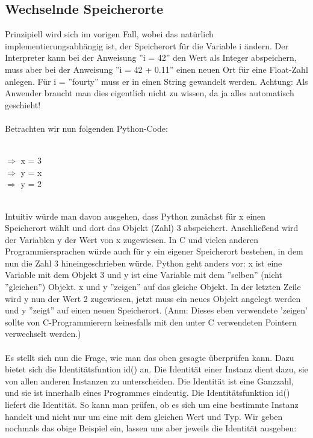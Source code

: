 \subsection{Wechselnde Speicherorte}
Prinzipiell wird sich im vorigen Fall, wobei das natürlich implementierungsabhängig ist, der Speicherort für die Variable i ändern. Der Interpreter kann bei der Anweisung ''i = 42'' den Wert als Integer abspeichern, muss aber bei der Anweisung ''i = 42 + 0.11'' einen neuen Ort für eine Float-Zahl anlegen. Für i = ''fourty'' muss er in einen String gewandelt werden.
Achtung: Als Anwender braucht man dies eigentlich nicht zu wissen, da ja alles automatisch geschieht! \\
\\
Betrachten wir nun folgenden Python-Code: \\
\\
\begin{MyConsoleBox}{
${\Longrightarrow}$ x = 3 \\
${\Longrightarrow}$ y = x \\
${\Longrightarrow}$ y = 2 \\
}\end{MyConsoleBox}
\\
Intuitiv würde man davon ausgehen, dass Python zunächst für x einen Speicherort wählt und dort das Objekt (Zahl) 3 abspeichert. Anschließend wird der Variablen y der Wert von x zugewiesen. In C und vielen anderen Programmiersprachen würde auch für y ein eigener Speicherort bestehen, in dem nun die Zahl 3 hineingeschrieben würde. Python geht anders vor: x ist eine Variable mit dem Objekt 3 und y ist eine Variable mit dem ''selben'' (nicht ''gleichen'') Objekt. x und y ''zeigen'' auf das gleiche Objekt. In der letzten Zeile wird y nun der Wert 2 zugewiesen, jetzt muss ein neues Objekt angelegt werden und y ''zeigt'' auf einen neuen Speicherort. (Anm: Dieses eben verwendete 'zeigen' sollte von C-Programmierern keinesfalls mit den unter C verwendeten Pointern verwechselt werden.)\\
\\
Es stellt sich nun die Frage, wie man das oben gesagte überprüfen kann. Dazu bietet sich die Identitätsfuntion id() an. Die Identität einer Instanz dient dazu, sie von allen anderen Instanzen zu unterscheiden. Die Identität ist eine Ganzzahl, und sie ist innerhalb eines Programmes eindeutig. Die Identitätsfunktion id() liefert die Identität. So kann man prüfen, ob es sich um eine bestimmte Instanz handelt und nicht nur um eine mit dem gleichen Wert und Typ. Wir geben nochmals das obige Beispiel ein, lassen uns aber jeweils die Identität ausgeben: \\

